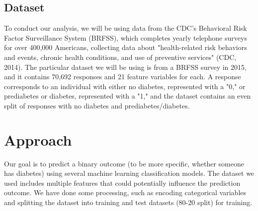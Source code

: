 \documentclass[12pt]{article}
\begin{document}
\subsection{Dataset}
To conduct our analysis, we will be using data from the CDC's Behavioral Risk Factor Surveillance System (BRFSS), which completes yearly telephone surveys for over 400,000 Americans, collecting data about "health-related risk behaviors and events, chronic health conditions, and use of preventive services" (CDC, 2014). The particular dataset we will be using is from a BRFSS survey in 2015, and it contains 70,692 responses and 21 feature variables for each. A response corresponds to an individual with either no diabetes, represented with a "0," or prediabetes or diabetes, represented with a "1," and the dataset contains an even split of responses with no diabetes and prediabetes/diabetes.

\section{Approach}
Our goal is to predict a binary outcome (to be more specific, whether someone has diabetes) using several machine learning classification models. The dataset we used  includes multiple features that could potentially influence the prediction outcome. We have done some processing, such as  encoding categorical variables and splitting the dataset into training and test datasets (80-20 split) for training. 
\end{document}

